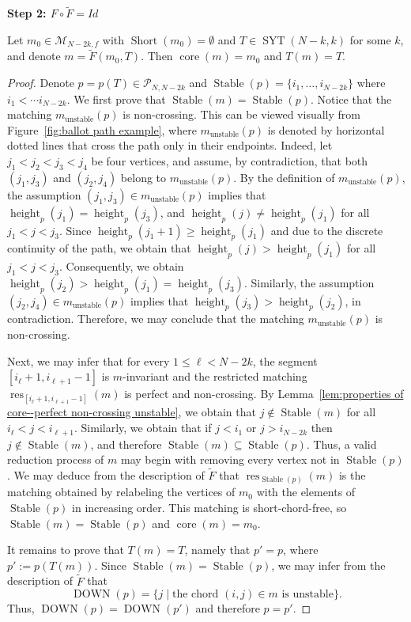 \documentclass[ALCO]{cedram}
\makeatletter
\newcommand{\Syt}{\operatorname{SYT}}
\newcommand{\Short}{\operatorname{Short}}
\newcommand{\Stable}{\operatorname{Stable}}
\newcommand{\height}{\operatorname{height}}
\newcommand{\core}{\operatorname{core}}
\newcommand{\res}{\operatorname{res}}
\newcommand{\DOWN}{\operatorname{DOWN}}
\newcommand{\M}{\mathcal{M}}
\newcommand{\Pcal}{\mathcal{P}}
\newcommand{\proofstep}[1]{%
  \par%
  \addvspace{\medskipamount}%
  \textbf{#1\@addpunct{.}}\enspace\ignorespaces
}
\makeatother
\begin{document}
\proofstep{Step 2: $F \circ \tilde{F} = Id$}
\begin{lemma}
\label{lem:F(F_tilde)=id}
    Let $m_0 \in \M_{N-2k,f}$ with $\Short(m_0) = \emptyset$ and $T \in \Syt(N-k,k)$ for some $k$, and denote $m = \tilde{F}(m_0,T)$. Then $\core(m)=m_0$ and $T(m) = T$.
\end{lemma}
\begin{proof}
    Denote $p=p(T) \in \Pcal_{N,N-2k}$ and $\Stable(p) = \{i_1, \dots, i_{N-2k}\}$ where $i_1 < \cdots i_{N-2k}$. We first prove that $\Stable(m) = \Stable(p)$. Notice that the matching $m_{\text{unstable}}(p)$ is non-crossing. This can be viewed visually from Figure~\ref{fig:ballot path example}, where $m_{\text{unstable}}(p)$ is denoted by horizontal dotted lines that cross the path only in their endpoints. Indeed, let $j_1 < j_2 < j_3 < j_4$ be four vertices, and assume, by contradiction, that both $(j_1,j_3)$ and $(j_2,j_4)$ belong to $m_{\text{unstable}}(p)$. By the definition of $m_{\text{unstable}}(p)$, the assumption $(j_1,j_3) \in m_{\text{unstable}}(p)$ implies that $\height_p(j_1) = \height_p(j_3)$, and $\height_p(j) \ne \height_p(j_1)$ for all $j_1 < j < j_3$. Since $\height_p(j_1+1) \ge \height_p(j_1)$ and due to the discrete continuity of the path, we obtain that $\height_p(j) > \height_p(j_1)$ for all $j_1 < j < j_3$. Consequently, we obtain $\height_p(j_2) > \height_p(j_1) = \height_p(j_3)$. Similarly, the assumption $(j_2,j_4) \in m_{\text{unstable}}(p)$ implies that $\height_p(j_3) > \height_p(j_2)$, in contradiction. Therefore, we may conclude that the matching $m_{\text{unstable}}(p)$ is non-crossing.
    
    Next, we may infer that for every $1 \le \ell < N-2k$, the segment $[i_\ell+1,i_{\ell+1}-1]$ is $m$-invariant and the restricted matching $\res_{[i_\ell+1,i_{\ell+1}-1]}(m)$ is perfect and non-crossing. By Lemma~\ref{lem:properties of core--perfect non-crossing unstable}, we obtain that $j \notin \Stable(m)$ for all $i_\ell < j < i_{\ell+1}$. Similarly, we obtain that if $j < i_1$ or $j > i_{N-2k}$ then $j \notin \Stable(m)$, and therefore $\Stable(m) \subseteq \Stable(p)$. Thus, a valid reduction process of $m$ may begin with removing every vertex not in $\Stable(p)$. We may deduce from the description of $\tilde{F}$ that $\res_{\Stable(p)}(m)$ is the matching obtained by relabeling the vertices of $m_0$ with the elements of $\Stable(p)$ in increasing order. This matching is short-chord-free, so $\Stable(m) = \Stable(p)$ and $\core(m) = m_0$.

    It remains to prove that $T(m) = T$, namely that $p' = p$, where $p' := p(T(m))$. Since $\Stable(m) = \Stable(p)$, we may infer from the description of $\tilde{F}$ that
    \[
        \DOWN(p) = \{j \mid \text{the chord } (i,j) \in m \text{ is unstable}\}.
    \]
    Thus, $\DOWN(p) = \DOWN(p')$ and therefore $p = p'$.
\end{proof}
\end{document}

